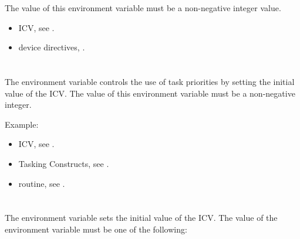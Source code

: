 The value of this environment variable must be a non-negative integer value.

\crossreferences
\begin{itemize}
\item {} ICV, see .

\item device directives, .
\end{itemize}



\section{}
\label{sec:OMP_MAX_TASK_PRIORITY}

The  environment variable controls the use of task
priorities by setting the initial value of the  ICV. The
value of this environment variable must be a non-negative integer.

Example:
\begin{ompEnv}
\end{ompEnv}

\crossreferences
\begin{itemize}
\item {} ICV, see .

\item Tasking Constructs, see .

\item {} routine, 
see .
\end{itemize}



\section{}
\label{sec:OMP_TARGET_OFFLOAD}
The  environment variable sets the initial value of 
the  ICV. The value of the  
environment variable must be one of the following:

